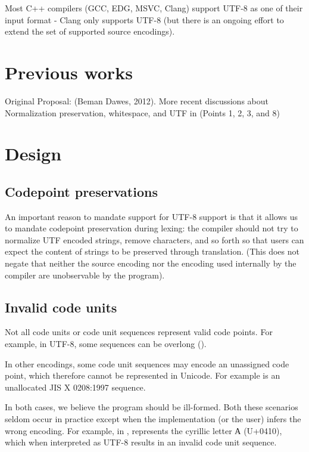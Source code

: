\documentclass{wg21}
\begin{document}
Most C++ compilers (GCC, EDG, MSVC, Clang) support UTF-8 as one of their input format - Clang only supports UTF-8 (but there is an ongoing effort to extend the set of supported
source encodings).

\section{Previous works}

Original Proposal:  (Beman Dawes, 2012).
More recent discussions about Normalization preservation, whitespace, and UTF in  (Points 1, 2, 3, and 8)

\section{Design}

\subsection{Codepoint preservations}

An important reason to mandate support for UTF-8 support is that it allows us to mandate codepoint preservation during lexing:
the compiler should not try to normalize UTF encoded strings, remove characters, and so forth so that users can expect the content
of strings to be preserved through translation.
(This does not negate that neither the source encoding nor the encoding used internally by the compiler are unobservable by the program).

\subsection{Invalid code units}

Not all code units or code unit sequences represent valid code points.
For example, in UTF-8, some sequences can be overlong ().

In other encodings, some code unit sequences may encode an unassigned code point, which therefore cannot be represented in Unicode.
For example  is an unallocated JIS X 0208:1997 sequence.

In both cases, we believe the program should be ill-formed.
Both these scenarios seldom occur in practice except when the implementation (or the user) infers the wrong encoding.
For example, in ,  represents the cyrillic letter А (U+0410), which when interpreted
as UTF-8 results in an invalid code unit sequence.
\end{document}
